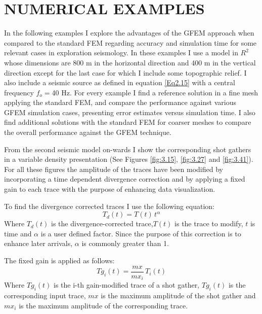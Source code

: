 %
%
%
%

\chapter{ \uppercase{Numerical Examples}}

In the following examples I explore the advantages of the GFEM approach when compared to the standard FEM regarding accuracy and simulation time for some relevant cases in exploration seismology. In these examples I use a model in $R^2$ whose dimensions are 800 m in the horizontal direction and 400 m in the vertical direction except for the last case for which I include some topographic relief. I also include a seismic source as defined in equation \ref{Eq2.15} with a central frequency $f_o=$40 Hz. For every example I find a reference solution in a fine mesh applying the standard FEM, and compare the performance against various GFEM simulation cases, presenting error estimates versus simulation time. I also find additional solutions with the standard FEM for coarser meshes to compare the overall performance against the GFEM technique. 

From the second seismic model on-wards I show the corresponding shot gathers in a variable density presentation (See Figures \ref{fig:3.15}, \ref{fig:3.27} and  \ref{fig:3.41}). For all these figures the amplitude of the traces have been modified by incorporating a time dependent divergence correction and by applying a fixed gain to each trace with the purpose of enhancing data visualization.

To find the divergence corrected traces I use the following equation:
 \begin{equation} \label{Eq3.1}
  T_d(t) = T(t)\, t^\alpha
 \end{equation}
Where  $T_d(t)$ is the divergence-corrected trace,$T(t)$ is the trace to modify, $t$ is time and $\alpha$ is a user defined factor. Since the purpose of this correction is to enhance later arrivals, $\alpha$ is commonly greater than 1.

The fixed gain is applied as follows:
 \begin{equation} \label{Eq3.2}
  Tg_i(t) = \frac{mx}{mx_i}\, T_i(t)
 \end{equation}
Where $Tg_i(t)$ is the i-th gain-modified trace of a shot gather, $Tg_i(t)$ is the corresponding input trace, $mx$ is the maximum amplitude of the shot gather and $mx_i$ is the maximum amplitude of the corresponding trace.

